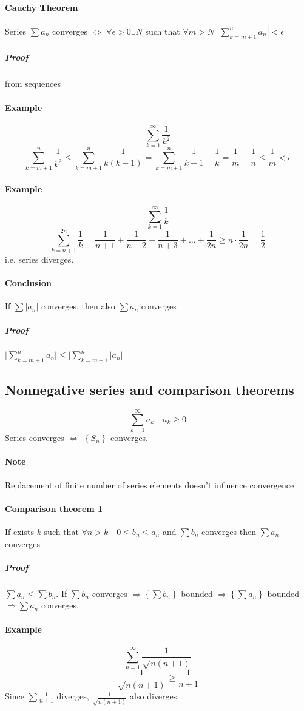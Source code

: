 \paragraph{Cauchy Theorem} Series $\sum a_n$ converges $\iff$ $\forall \epsilon > 0 \exists N$ such that $\forall m > N$ $\left| \sum_{k=m+1}^{n} a_n\right| < \epsilon$
\subparagraph{Proof} from sequences
\paragraph{Example} $$\sum_{k=1}^\infty \frac{1}{k^2}$$
$$\sum_{k=m+1}^{n}\frac{1}{k^2} \leq \sum_{k=m+1}^{n} \frac{1}{k(k-1)} = \sum_{k=m+1}^{n} \frac{1}{k-1}-\frac{1}{k} = \frac{1}{m} - \frac{1}{n} \leq \frac{1}{m} < \epsilon $$
\paragraph{Example} $$\sum_{k=1}^\infty \frac{1}{k}$$
$$\sum_{k=n+1}^{2n}\frac{1}{k}= \frac{1}{n+1}+\frac{1}{n+2}+\frac{1}{n+3}+\dots + \frac{1}{2n} \geq n \cdot \frac{1}{2n} = \frac{1}{2}$$
i.e. series diverges.
\paragraph{Conclusion} If $\sum \left| a_n \right|$ converges, then also $\sum a_n$ converges
\subparagraph{Proof} $\bigg|\sum_{k=m+1}^{n} a_n\bigg| \leq \bigg|\sum_{k=m+1}^{n}\left| a_n \right| \bigg|$
\subsection{Nonnegative series and comparison theorems} $$\sum_{k=1}^{\infty} a_k \quad a_k \geq 0$$
Series converges $\iff$ $\left\{ S_n\right\}$ converges.
\paragraph{Note} Replacement of finite number of series elements doesn't influence convergence
\paragraph{Comparison theorem 1} If exists $k$ such that $\forall n > k \quad 0 \leq b_n \leq a_n$ and $\sum b_n$ converges then $\sum a_n$ converges
\subparagraph{Proof} $\sum a_n \leq \sum b_n$. If $\sum b_n$ converges $\Rightarrow \left\{ \sum b_n \right\}$ bounded  $\Rightarrow \left\{ \sum a_n \right\}$ bounded $\Rightarrow \sum a_n$ converges.
\paragraph{Example} $$\sum_{n=1}^{\infty} \frac{1}{\sqrt{n(n+1)}}$$
$$\frac{1}{\sqrt{n(n+1)}} \geq \frac{1}{n+1}$$
Since $\sum \frac{1}{n+1}$ diverges, $\frac{1}{\sqrt{n(n+1)}}$ also diverges.
